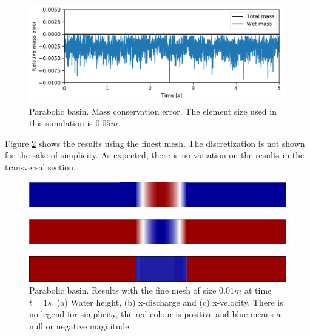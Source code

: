 \documentclass[a4paper,12pt]{elsarticle}
\begin{document}
\begin{figure}[H]
    \centering
    \includegraphics[width=.95\textwidth]{img/par/mass_conservation}
    \caption{Parabolic basin. Mass conservation error. The element size used in this simulation is $0.05m$.}
    \label{parabola_mass}
\end{figure}

Figure \ref{parabola_results} shows the results using the finest mesh. The discretization is not shown for the sake of simplicity. As expected, there is no variation on the results in the transversal section.

\begin{figure}[H]
    \begin{subfigure}{.05\textwidth}
        \caption{}
    \end{subfigure}
    \begin{minipage}[c]{.94\textwidth}
        \includegraphics[width=\textwidth]{img/par/height_1.0.png}
    \end{minipage}
\par\medskip
    \begin{subfigure}{.05\textwidth}
        \caption{}
    \end{subfigure}
    \begin{minipage}[c]{.94\textwidth}
        \includegraphics[width=\textwidth]{img/par/momentum_1.0.png}
    \end{minipage}
\par\medskip
    \begin{subfigure}{.05\textwidth}
        \caption{}
    \end{subfigure}
    \begin{minipage}[c]{.94\textwidth}
        \includegraphics[width=\textwidth]{img/par/velocity_1.0.png}
    \end{minipage}
\caption{Parabolic basin. Results with the fine mesh of size $0.01m$ at time $t=1s$. (a) Water height, (b) x-discharge and (c) x-velocity. There is no legend for simplicity, the red colour is positive and blue means a null or negative magnitude.}
\label{parabola_results}
\end{figure}
\end{document}
